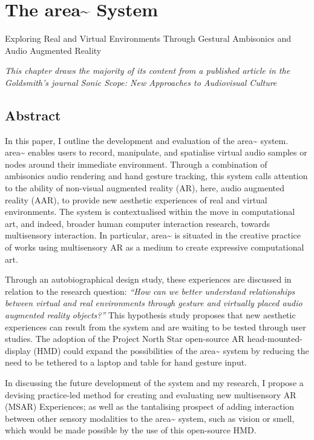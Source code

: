 \chapter{The area\textasciitilde{} System}
{Exploring Real and Virtual Environments Through Gestural Ambisonics and Audio Augmented Reality}
\label{sec: area}
\epigraph{\emph{This chapter draws the majority of its content from a published article in the Goldsmith's journal \textit{Sonic Scope: New Approaches to Audiovisual Culture}}}{\citep[]{bilbow2021a}}

\section{Abstract}                              \label{sec: area-abstract}
In this paper, I outline the development and evaluation of the area\textasciitilde{} system. area\textasciitilde{} enables users to record, manipulate, and spatialise virtual audio samples or nodes around their immediate environment. Through a combination of ambisonics audio rendering and hand gesture tracking, this system calls attention to the ability of non-visual augmented reality (AR), here, audio augmented reality (AAR), to provide new aesthetic experiences of real and virtual environments. The system is contextualised within the move in computational art, and indeed, broader human computer interaction research, towards multisensory interaction. In particular, area\textasciitilde{} is situated in the creative practice of works using multisensory AR as a medium to create expressive computational art.

Through an autobiographical design study, these experiences are discussed in relation to the research question: \textit{“How can we better understand relationships between virtual and real environments through gesture and virtually placed audio augmented reality objects?”} This hypothesis study proposes that new aesthetic experiences can result from the system and are waiting to be tested through user studies. The adoption of the Project North Star open-source AR head-mounted-display (HMD) could expand the possibilities of the area\textasciitilde{} system by reducing the need to be tethered to a laptop and table for hand gesture input.

In discussing the future development of the system and my research, I propose a devising practice-led method for creating and evaluating new multisensory AR (MSAR) Experiences; as well as the tantalising prospect of adding interaction between other sensory modalities to the area\textasciitilde{} system, such as vision or smell, which would be made possible by the use of this open-source HMD.


